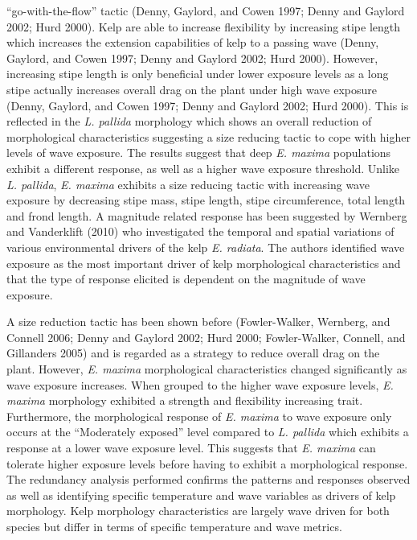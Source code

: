 \documentclass[
  a4paper,
]{article}
\begin{document}
``go-with-the-flow'' tactic (Denny, Gaylord, and Cowen 1997; Denny and
Gaylord 2002; Hurd 2000). Kelp are able to increase flexibility by
increasing stipe length which increases the extension capabilities of
kelp to a passing wave (Denny, Gaylord, and Cowen 1997; Denny and
Gaylord 2002; Hurd 2000). However, increasing stipe length is only
beneficial under lower exposure levels as a long stipe actually
increases overall drag on the plant under high wave exposure (Denny,
Gaylord, and Cowen 1997; Denny and Gaylord 2002; Hurd 2000). This is
reflected in the \emph{L. pallida} morphology which shows an overall
reduction of morphological characteristics suggesting a size reducing
tactic to cope with higher levels of wave exposure. The results suggest
that deep \emph{E. maxima} populations exhibit a different response, as
well as a higher wave exposure threshold. Unlike \emph{L. pallida},
\emph{E. maxima} exhibits a size reducing tactic with increasing wave
exposure by decreasing stipe mass, stipe length, stipe circumference,
total length and frond length. A magnitude related response has been
suggested by Wernberg and Vanderklift (2010) who investigated the
temporal and spatial variations of various environmental drivers of the
kelp \emph{E. radiata}. The authors identified wave exposure as the most
important driver of kelp morphological characteristics and that the type
of response elicited is dependent on the magnitude of wave exposure.

A size reduction tactic has been shown before (Fowler-Walker, Wernberg,
and Connell 2006; Denny and Gaylord 2002; Hurd 2000; Fowler-Walker,
Connell, and Gillanders 2005) and is regarded as a strategy to reduce
overall drag on the plant. However, \emph{E. maxima} morphological
characteristics changed significantly as wave exposure increases. When
grouped to the higher wave exposure levels, \emph{E. maxima} morphology
exhibited a strength and flexibility increasing trait. Furthermore, the
morphological response of \emph{E. maxima} to wave exposure only occurs
at the ``Moderately exposed'' level compared to \emph{L. pallida} which
exhibits a response at a lower wave exposure level. This suggests that
\emph{E. maxima} can tolerate higher exposure levels before having to
exhibit a morphological response. The redundancy analysis performed
confirms the patterns and responses observed as well as identifying
specific temperature and wave variables as drivers of kelp morphology.
Kelp morphology characteristics are largely wave driven for both species
but differ in terms of specific temperature and wave metrics.
\end{document}
